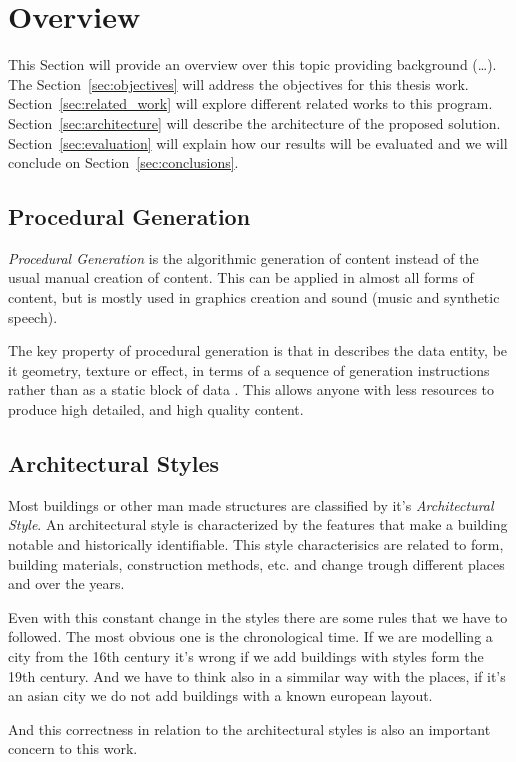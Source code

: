 
% 
% 

\section{Overview} %
\label{sec:overview}


This Section will provide an overview over this topic providing background (\dots). The Section~\ref{sec:objectives} will address the objectives for this thesis work. Section~\ref{sec:related_work} will explore different related works to this program. Section~\ref{sec:architecture} will describe the architecture of the proposed solution. Section~\ref{sec:evaluation} will explain how our results will be evaluated and we will conclude on Section~\ref{sec:conclusions}.

\subsection{Procedural Generation} %
\label{sub:procedural_generation}


\emph{Procedural Generation} is the algorithmic generation of content instead of the usual manual creation of content. This can be applied in almost all forms of content, but is mostly used in graphics creation and sound (music and synthetic speech).

The key property of procedural generation is that in describes the data entity, be it geometry, texture or effect, in terms of a sequence of generation instructions rather than as a static block of data \cite{Kelly}. This allows anyone with less resources to produce high detailed, and high quality content.




\subsection{Architectural Styles} %
\label{sub:architectural_styles}

Most buildings or other man made structures are classified by it's \emph{Architectural Style}. An architectural style is characterized by the features that make a building notable and historically identifiable. This style characterisics are related to form, building materials, construction methods, etc. and change trough different places and over the years. 

Even with this constant change in the styles there are some rules that we have to followed. The most obvious one is the chronological time.
If we are modelling a city from the 16th century it's wrong if we add buildings with styles form the 19th century. And we have to think also in a simmilar way with the places, if it's an asian city we do not add buildings with a known european layout.

And this correctness in relation to the architectural styles is also an important concern to this work.



